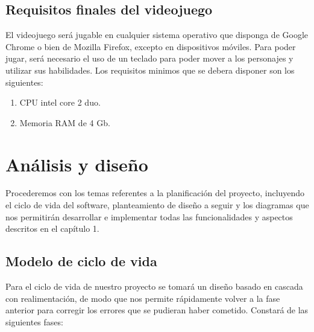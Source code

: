 \documentclass[palatino]{apuntes}
\begin{document}
\section{Requisitos finales del videojuego}
El videojuego será jugable en cualquier sistema operativo que disponga de Google Chrome o bien de Mozilla Firefox, excepto en dispositivos móviles.
Para poder jugar, será necesario el uso de un teclado para poder mover a los personajes y utilizar sus habilidades.
Los requisitos minimos que se debera disponer son los siguientes:

\begin{enumerate}
	\item CPU intel core 2 duo.
	\item Memoria RAM de 4 Gb.
\end{enumerate}
	

\chapter{Análisis y diseño}
Procederemos con los temas referentes a la planificación del proyecto, incluyendo el ciclo de vida del software, planteamiento de diseño a seguir y los diagramas que nos permitirán desarrollar e implementar todas las funcionalidades y aspectos descritos en el capítulo 1.

\section{Modelo de ciclo de vida}

Para el ciclo de vida de nuestro proyecto se tomará un diseño basado en cascada con realimentación, de modo que nos permite rápidamente volver a la fase anterior para corregir los errores que se pudieran haber cometido. Constará de las siguientes fases:
\end{document}
